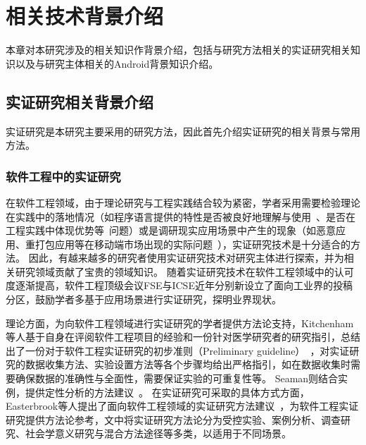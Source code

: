 \chapter{相关技术背景介绍}
\label{chp:background}
%

本章对本研究涉及的相关知识作背景介绍，包括与研究方法相关的实证研究相关知识以及与研究主体相关的Android背景知识介绍。

\section{实证研究相关背景介绍}
实证研究是本研究主要采用的研究方法，因此首先介绍实证研究的相关背景与常用方法。

\subsection{软件工程中的实证研究}
在软件工程领域，由于理论研究与工程实践结合较为紧密，学者采用需要检验理论在实践中的落地情况（如程序语言提供的特性是否被良好地理解与使用~\cite{bieman1995reuse}、是否在工程实践中体现优势等~\cite{harrison2000experimental}问题）或是调研现实应用场景中产生的现象（如恶意应用、重打包应用等在移动端市场出现的实际问题~\cite{Felt2011ASO, Zhou2012DissectingAM, Andow2016ASO, wang2018android}），实证研究技术是十分适合的方法。
因此，有越来越多的研究者使用实证研究技术对研究主体进行探索\cite{Felt2011ASO, Zhou2012DissectingAM, Andow2016ASO, wang2018android, chen2018ausera, chen2018mobile, bieman1995reuse, harrison2000experimental, dybaa2008empirical, manotas2016empirical, mcintosh2016empirical, mcilroy2016fresh, wu2016ji, yang2015xin, hu2019dating, khanmohammadi2019empirical}，并为相关研究领域贡献了宝贵的领域知识。
随着实证研究技术在软件工程领域中的认可度逐渐提高，软件工程顶级会议FSE与ICSE近年分别新设立了面向工业界的投稿分区，鼓励学者多基于应用场景进行实证研究，探明业界现状。

理论方面，为向软件工程领域进行实证研究的学者提供方法论支持，Kitchenham等人基于自身在评阅软件工程项目的经验和一份针对医学研究者的研究指引，总结出了一份对于软件工程实证研究的初步准则（Preliminary guideline）~\cite{kitchenham2002preliminary}，对实证研究的数据收集方法、实验设置方法等各个步骤均给出严格指引，如在数据收集时需要确保数据的准确性与全面性，需要保证实验的可重复性等。
Seaman则结合实例，提供定性分析的方法建议~\cite{seaman1999qualitative}。
在实证研究可采取的具体方式方面，Easterbrook等人提出了面向软件工程领域的实证研究方法建议~\cite{easterbrook2008selecting}，为软件工程实证研究提供方法论参考，文中将实证研究方法论分为受控实验、案例分析、调查研究、社会学意义研究与混合方法途径等多类，以适用于不同场景。

